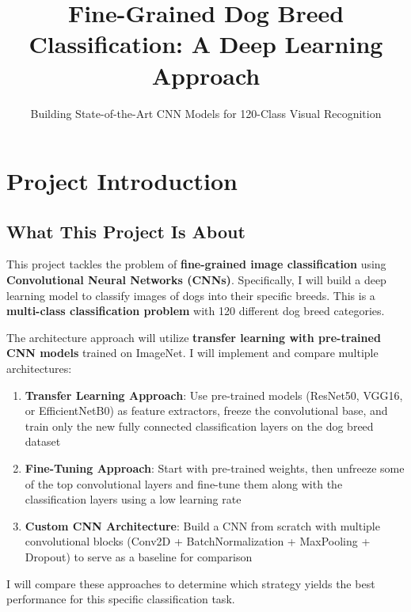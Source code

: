 \documentclass[
  letterpaper,
  DIV=11,
  numbers=noendperiod]{scrartcl}
\title{Fine-Grained Dog Breed Classification: A Deep Learning Approach}
\subtitle{Building State-of-the-Art CNN Models for 120-Class Visual
Recognition}
\author{}
\date{}
\providecommand{\tightlist}{%
  \setlength{\itemsep}{0pt}\setlength{\parskip}{0pt}}
\renewcommand*\contentsname{Table of contents}
\newcommand\contentsname{Table of contents}
\begin{document}
\maketitle

\renewcommand*\contentsname{Table of contents}
{
\hypersetup{linkcolor=}
\setcounter{tocdepth}{3}
\tableofcontents
}

\section{Project Introduction}\label{project-introduction}

\subsection{What This Project Is
About}\label{what-this-project-is-about}

This project tackles the problem of \textbf{fine-grained image
classification} using \textbf{Convolutional Neural Networks (CNNs)}.
Specifically, I will build a deep learning model to classify images of
dogs into their specific breeds. This is a \textbf{multi-class
classification problem} with 120 different dog breed categories.

The architecture approach will utilize \textbf{transfer learning with
pre-trained CNN models} trained on ImageNet. I will implement and
compare multiple architectures:

\begin{enumerate}
\def\labelenumi{\arabic{enumi}.}
\tightlist
\item
  \textbf{Transfer Learning Approach}: Use pre-trained models (ResNet50,
  VGG16, or EfficientNetB0) as feature extractors, freeze the
  convolutional base, and train only the new fully connected
  classification layers on the dog breed dataset
\item
  \textbf{Fine-Tuning Approach}: Start with pre-trained weights, then
  unfreeze some of the top convolutional layers and fine-tune them along
  with the classification layers using a low learning rate
\item
  \textbf{Custom CNN Architecture}: Build a CNN from scratch with
  multiple convolutional blocks (Conv2D + BatchNormalization +
  MaxPooling + Dropout) to serve as a baseline for comparison
\end{enumerate}

I will compare these approaches to determine which strategy yields the
best performance for this specific classification task.
\end{document}
